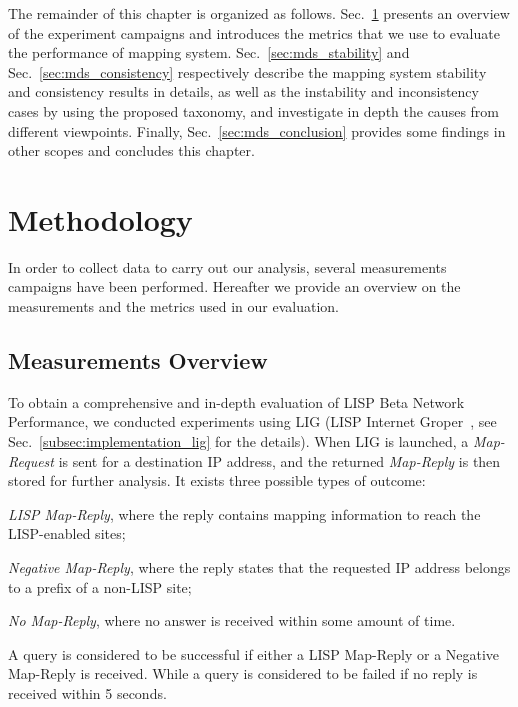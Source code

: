 The remainder of this chapter is organized as follows. Sec.~\ref{sec:mds_methodology} presents an overview of the experiment campaigns and introduces the metrics that we use to evaluate the performance of mapping system. Sec.~\ref{sec:mds_stability} and Sec.~\ref{sec:mds_consistency} respectively describe the mapping system stability and consistency results in details, as well as the instability and inconsistency cases by using the proposed taxonomy, and investigate in depth the causes from different viewpoints. Finally, Sec.~\ref{sec:mds_conclusion} provides some findings in other scopes and concludes this chapter.

\section{Methodology}
\label{sec:mds_methodology}
In order to collect data to carry out our analysis, several measurements campaigns have been performed. Hereafter we provide an overview on the measurements and the metrics used in our evaluation.

\subsection{Measurements Overview}
\label{sec:mds_overview}
To obtain a comprehensive and in-depth evaluation of LISP Beta Network Performance, we conducted experiments using LIG (LISP Internet Groper~\cite{rfc6835}, see Sec.~\ref{subsec:implementation_lig} for the details). When LIG is launched, a \emph{Map-Request} is sent for a destination IP address, and the returned \emph{Map-Reply} is then stored for further analysis. It exists three possible types of outcome: 
\begin{inparaenum}[(i)]
	\item \emph{LISP Map-Reply}, where the reply contains mapping
	information to reach the LISP-enabled sites;
	\item \emph{Negative Map-Reply}, where the reply states that the requested IP address belongs to a prefix of a non-LISP site;
	\item \emph{No Map-Reply}, where no answer is received within some
amount of time.
\end{inparaenum}
A query is considered to be successful if either a LISP Map-Reply or a Negative Map-Reply is received. While a query is considered to be failed if no reply is received within 5 seconds. 


